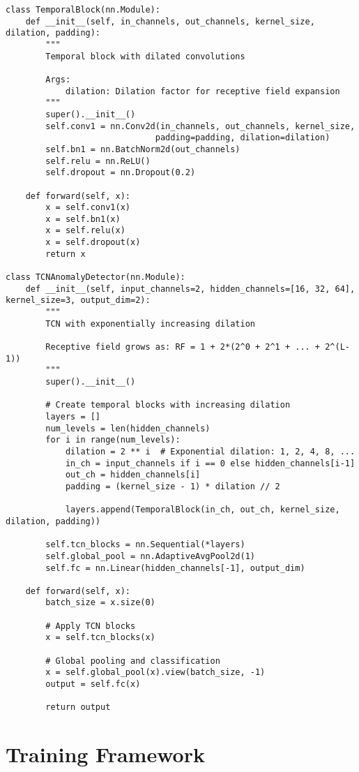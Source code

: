 \documentclass[12pt,a4paper]{article}
\begin{document}
\begin{lstlisting}[caption={TCN Anomaly Detector - Parallel Temporal Processing}]
class TemporalBlock(nn.Module):
    def __init__(self, in_channels, out_channels, kernel_size, dilation, padding):
        """
        Temporal block with dilated convolutions

        Args:
            dilation: Dilation factor for receptive field expansion
        """
        super().__init__()
        self.conv1 = nn.Conv2d(in_channels, out_channels, kernel_size,
                              padding=padding, dilation=dilation)
        self.bn1 = nn.BatchNorm2d(out_channels)
        self.relu = nn.ReLU()
        self.dropout = nn.Dropout(0.2)

    def forward(self, x):
        x = self.conv1(x)
        x = self.bn1(x)
        x = self.relu(x)
        x = self.dropout(x)
        return x

class TCNAnomalyDetector(nn.Module):
    def __init__(self, input_channels=2, hidden_channels=[16, 32, 64], kernel_size=3, output_dim=2):
        """
        TCN with exponentially increasing dilation

        Receptive field grows as: RF = 1 + 2*(2^0 + 2^1 + ... + 2^(L-1))
        """
        super().__init__()

        # Create temporal blocks with increasing dilation
        layers = []
        num_levels = len(hidden_channels)
        for i in range(num_levels):
            dilation = 2 ** i  # Exponential dilation: 1, 2, 4, 8, ...
            in_ch = input_channels if i == 0 else hidden_channels[i-1]
            out_ch = hidden_channels[i]
            padding = (kernel_size - 1) * dilation // 2

            layers.append(TemporalBlock(in_ch, out_ch, kernel_size, dilation, padding))

        self.tcn_blocks = nn.Sequential(*layers)
        self.global_pool = nn.AdaptiveAvgPool2d(1)
        self.fc = nn.Linear(hidden_channels[-1], output_dim)

    def forward(self, x):
        batch_size = x.size(0)

        # Apply TCN blocks
        x = self.tcn_blocks(x)

        # Global pooling and classification
        x = self.global_pool(x).view(batch_size, -1)
        output = self.fc(x)

        return output
\end{lstlisting}

\section{Training Framework}
\end{document}
